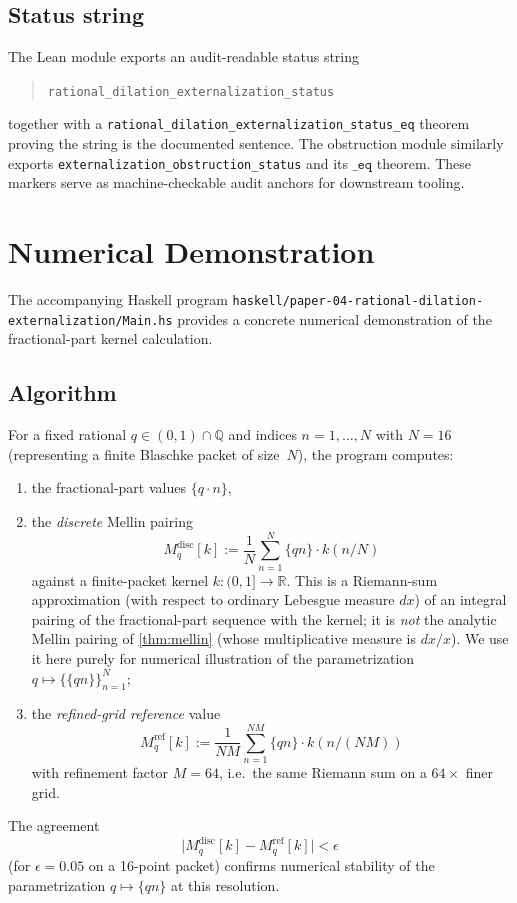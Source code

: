 \documentclass[12pt]{article}
\theoremstyle{plain}
\theoremstyle{definition}
\theoremstyle{remark}
\newcommand{\Real}{\mathbb{R}}
\newcommand{\Rationals}{\mathbb{Q}}
\newcommand{\fracpart}[1]{\{#1\}}
\begin{document}
\subsection{Status string}

The Lean module exports an audit-readable status string
\begin{quote}
  \texttt{rational\_dilation\_externalization\_status}
\end{quote}
together with a \texttt{rational\_dilation\_externalization\_status\_eq}
theorem proving the string is the documented sentence.  The
obstruction module similarly exports
\texttt{externalization\_obstruction\_status} and its
$\texttt{\_eq}$ theorem.  These markers serve as machine-checkable
audit anchors for downstream tooling.

\section{Numerical Demonstration}
\label{sec:demo}

The accompanying Haskell program
\texttt{haskell/paper-04-rational-dilation-externalization/Main.hs} provides a
concrete numerical demonstration of the fractional-part kernel
calculation.

\subsection{Algorithm}

For a fixed rational $q\in (0,1)\cap\Rationals$ and indices
$n=1,\dots,N$ with $N=16$ (representing a finite Blaschke packet of
size~$N$), the program computes:
\begin{enumerate}[label=(\arabic*)]
  \item the fractional-part values $\fracpart{q\cdot n}$,
  \item the \emph{discrete} Mellin pairing
    \[
      M^{\mathrm{disc}}_q[k]
      := \frac{1}{N}\sum_{n=1}^{N}\fracpart{qn}\cdot k(n/N)
    \]
    against a finite-packet kernel $k\colon (0,1]\to\Real$.  This is
    a Riemann-sum approximation (with respect to ordinary Lebesgue
    measure $dx$) of an integral pairing of the fractional-part
    sequence with the kernel; it is \emph{not} the analytic Mellin
    pairing of \cref{thm:mellin} (whose multiplicative measure is
    $dx/x$).  We use it here purely for numerical illustration of the
    parametrization $q\mapsto \{\fracpart{qn}\}_{n=1}^{N}$;
  \item the \emph{refined-grid reference} value
    \[
      M^{\mathrm{ref}}_q[k]
      := \frac{1}{NM}\sum_{n=1}^{NM}\fracpart{qn}\cdot k(n/(NM))
    \]
    with refinement factor $M=64$, i.e.\ the same Riemann sum on a
    $64\times$ finer grid.
\end{enumerate}
The agreement
\[
  \bigl|M^{\mathrm{disc}}_q[k] - M^{\mathrm{ref}}_q[k]\bigr|
  < \epsilon
\]
(for $\epsilon=0.05$ on a 16-point packet) confirms numerical
stability of the parametrization $q\mapsto\fracpart{qn}$ at this
resolution.
\end{document}
